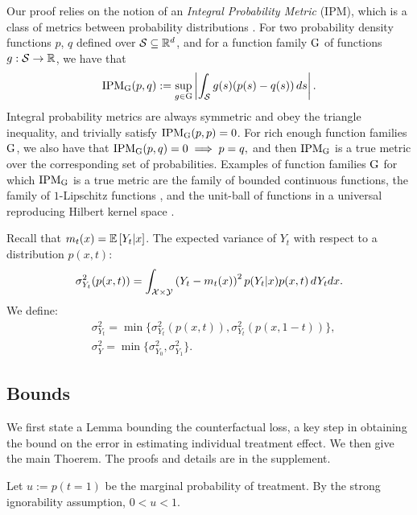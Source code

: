 Our proof relies on the notion of an \emph{Integral Probability Metric} (IPM), which is a class of metrics between probability distributions \citep{sriperumbudur2012empirical,muller1997integral}.
For two probability density functions $p$, $q$ defined over $\mathcal S \subseteq \mathbb{R}^d$, and for a function family $\mathrm{G}$ of functions $g : \mathcal S \rightarrow \mathbb{R}$, we have that $$\text{IPM}_{\mathrm{G}}(p,q) :=\sup_{g\in \mathrm{G}} \left| \int_\mathcal S g(s) (p(s)-q(s))\, ds \right|.$$
Integral probability metrics are always symmetric and obey the triangle inequality, and trivially satisfy $\text{IPM}_{\mathrm{G}}(p,p) = 0$. For rich enough function families $\mathrm{G}$, we also have that $\text{IPM}_{\mathrm{G}}(p,q) =0 \implies p=q,$ and then $\text{IPM}_{\mathrm{G}}$ is a true metric over the corresponding set of probabilities. Examples of function families $\mathrm{G}$ for which $\text{IPM}_{\mathrm{G}}$ is a true metric are the family of bounded continuous functions, the family of $1$-Lipschitz functions \citep{sriperumbudur2012empirical}, and the unit-ball of functions in a universal reproducing Hilbert kernel space \citep{gretton2012mmd}.



\begin{thmdef}
Recall that $m_t(x) = \mathbb{E}\left[Y_t|x\right]$.
The expected variance of $Y_t$ with respect to a distribution $p(x,t)$:
$$\sigma^2_{Y_t}(p(x,t)) = \int_{\mathcal X \times \mathcal Y} \left(Y_t - m_t(x)\right)^2 p(Y_t|x)p(x,t) \, dY_t dx .$$
We define:
\begin{align*}
&\sigma^2_{Y_t} = \min\{\sigma^2_{Y_t}(p(x,t)), \sigma^2_{Y_t}(p(x,1-t))\} , \\
&\sigma^2_{Y} = \min\{\sigma^2_{Y_0},\sigma^2_{Y_1}\}.
\end{align*}
\end{thmdef}
\subsection{Bounds}

We first state a Lemma bounding the counterfactual loss, a key step in obtaining the bound on the error in estimating individual treatment effect. We then give the main Thoerem. The proofs and details are in the supplement.

Let $u := p(t=1)$ be the marginal probability of treatment. By the strong ignorability assumption, $0<u<1$.

